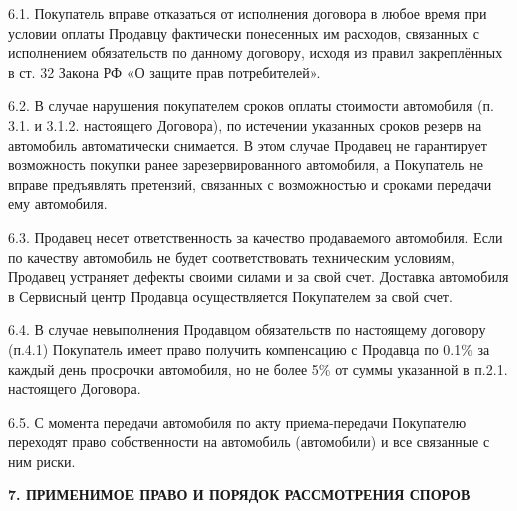 \documentclass[a4paper,12pt]{article}
\begin{document}
\begin{description}\item6.1. Покупатель вправе отказаться от исполнения договора в любое время при условии оплаты Продавцу фактически понесенных им расходов, связанных с исполнением обязательств по данному договору,  исходя из правил закреплённых в ст. 32 Закона РФ «О защите прав потребителей».\end{description}
\begin{description}\item6.2. В случае нарушения покупателем сроков оплаты стоимости автомобиля (п. 3.1. и 3.1.2. настоящего Договора), по истечении указанных сроков резерв на автомобиль автоматически снимается. В этом случае Продавец не гарантирует возможность покупки ранее зарезервированного автомобиля, а Покупатель не вправе предъявлять претензий, связанных с возможностью и сроками передачи ему автомобиля.\end{description} 
\begin{description}\item6.3. Продавец несет ответственность за качество продаваемого автомобиля. Если по качеству автомобиль не будет соответствовать техническим условиям, Продавец устраняет дефекты своими силами и за свой счет. Доставка автомобиля в Сервисный центр Продавца осуществляется Покупателем за свой счет.\end{description}
\begin{description}\item6.4. В случае невыполнения Продавцом  обязательств по настоящему договору (п.4.1) Покупатель имеет право получить компенсацию с Продавца по 0.1\%  за каждый день просрочки автомобиля, но не более 5\% от суммы указанной в п.2.1. настоящего Договора.
\end{description}
\begin{description}\item6.5. С момента передачи автомобиля по акту приема-передачи Покупателю переходят право собственности на автомобиль (автомобили) и все связанные с ним риски.\end{description}

 \begin{center}
 \vspace{1 ex}
 \textbf{7. ПРИМЕНИМОЕ ПРАВО И ПОРЯДОК РАССМОТРЕНИЯ СПОРОВ }
 \vspace{1ex}
    \end{center}
\end{document}
